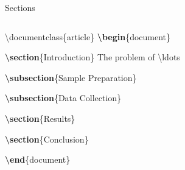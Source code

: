 \documentclass[,aspectratio=43]{beamer}
\newcommand{\VERB}{\Verb[commandchars=\\\{\}]}
\newenvironment{Shaded}{\begin{snugshade}}{\end{snugshade}}
\newcommand{\BuiltInTok}[1]{#1}
\newcommand{\ExtensionTok}[1]{#1}
\newcommand{\FunctionTok}[1]{\textcolor[rgb]{0.02,0.16,0.49}{#1}}
\newcommand{\KeywordTok}[1]{\textcolor[rgb]{0.00,0.44,0.13}{\textbf{#1}}}
\newcommand{\NormalTok}[1]{#1}
\providecommand{\tightlist}{%
  \setlength{\itemsep}{0pt}\setlength{\parskip}{0pt}}
\begin{document}
\begin{frame}[fragile]{Sections}

\begin{columns}[T]
\begin{column}{0.53\textwidth}
\small
\vspace{-1em}

\begin{Shaded}
\begin{Highlighting}[]
\BuiltInTok{\textbackslash{}documentclass}\NormalTok{\{}\ExtensionTok{article}\NormalTok{\} }
\KeywordTok{\textbackslash{}begin}\NormalTok{\{}\ExtensionTok{document}\NormalTok{\}}

\KeywordTok{\textbackslash{}section}\NormalTok{\{Introduction\}}
\NormalTok{The problem of }\FunctionTok{\textbackslash{}ldots} 

\KeywordTok{\textbackslash{}subsection}\NormalTok{\{Sample Preparation\} }

\KeywordTok{\textbackslash{}subsection}\NormalTok{\{Data Collection\}}

\KeywordTok{\textbackslash{}section}\NormalTok{\{Results\}}

\KeywordTok{\textbackslash{}section}\NormalTok{\{Conclusion\}}

\KeywordTok{\textbackslash{}end}\NormalTok{\{}\ExtensionTok{document}\NormalTok{\}}
\end{Highlighting}
\end{Shaded}
\end{column}


\end{columns}
\end{frame}
\end{document}

